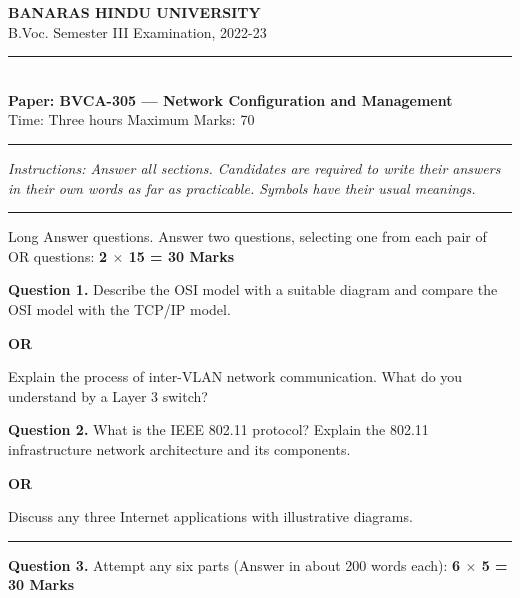 \documentclass[11pt,a4paper]{article}
\begin{document}
\begin{center}
  {\large\bfseries BANARAS HINDU UNIVERSITY}\\[2pt]
  {\normalsize B.Voc. Semester III Examination, 2022-23}\\[6pt]
  \rule{0.8\linewidth}{0.5pt}\\[6pt]
  {\large\bfseries Paper: BVCA-305 --- Network Configuration and Management}\\[4pt]
  {\normalsize Time: Three hours \hfill Maximum Marks: 70}
\end{center}

\rule{\linewidth}{0.4pt}

\smallskip



\noindent   \textit{Instructions: Answer all sections. Candidates are required to write their answers in their own words as far as practicable. Symbols have their usual meanings.}

\bigskip




\rule{\linewidth}{0.4pt}\smallskip

Long Answer questions. Answer two questions, selecting one from each pair of OR questions: \hfill   \textbf{2 $ \times$ 15 = 30 Marks}

\medskip



\noindent   \textbf{Question 1.} Describe the OSI model with a suitable diagram and compare the OSI model with the TCP/IP model.
\centerline{   \textbf{OR}}
Explain the process of inter-VLAN network communication. What do you understand by a Layer 3 switch?

\medskip



\noindent   \textbf{Question 2.} What is the IEEE 802.11 protocol? Explain the 802.11 infrastructure network architecture and its components.
\centerline{   \textbf{OR}}
Discuss any three Internet applications with illustrative diagrams.

\bigskip


\rule{\linewidth}{0.4pt}\smallskip




\noindent   \textbf{Question 3.} Attempt any six parts (Answer in about 200 words each): \hfill   \textbf{6 $ \times$ 5 = 30 Marks}
\end{document}
